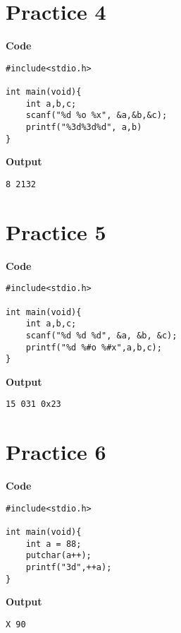 \documentclass[a4paper, 11pt]{article}
\begin{document}
    \section*{Practice 4}
    \begin{minipage}[t]{0.5\textwidth}
        \large \textbf{Code}
        \begin{lstlisting}[style=code]
#include<stdio.h>

int main(void){
    int a,b,c;
    scanf("%d %o %x", &a,&b,&c);
    printf("%3d%3d%d", a,b)
}
        \end{lstlisting}
    \end{minipage}
    \hspace{0.5cm}
    \begin{minipage}[t]{0.5\textwidth}
        \large \textbf{Output}
        \begin{lstlisting}[style=output]
  8 2132
        \end{lstlisting}
    \end{minipage}

    \section*{Practice 5}
    \begin{minipage}[t]{0.5\textwidth}
        \large \textbf{Code}
        \begin{lstlisting}[style=code]
#include<stdio.h>

int main(void){
    int a,b,c;
    scanf("%d %d %d", &a, &b, &c);
    printf("%d %#o %#x",a,b,c);
}
        \end{lstlisting}
    \end{minipage}
    \hspace{0.5cm}
    \begin{minipage}[t]{0.5\textwidth}
        \large \textbf{Output}
        \begin{lstlisting}[style=output]
15 031 0x23
        \end{lstlisting}
    \end{minipage}

    \section*{Practice 6}
    \begin{minipage}[t]{0.5\textwidth}
        \large \textbf{Code}
        \begin{lstlisting}[style=code]
#include<stdio.h>

int main(void){
    int a = 88;
    putchar(a++);
    printf("3d",++a);
}
        \end{lstlisting}
    \end{minipage}
    \hspace{0.5cm}
    \begin{minipage}[t]{0.5\textwidth}
        \large \textbf{Output}
        \begin{lstlisting}[style=output]
X 90
        \end{lstlisting}
    \end{minipage}
\end{document}
